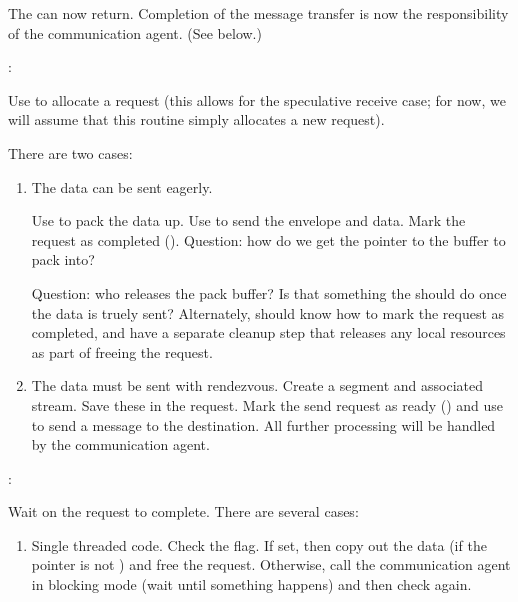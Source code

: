 \begin{mmadi}
\begin{tcp}
\begin{enumerate}
\begin{enumerate}
  The  can now return.  Completion of the message transfer
  is now the responsibility of the communication agent.  (See below.)

\end{enumerate}

\end{enumerate}
:

Use  to allocate a request (this allows for
the speculative receive case; for now, we will assume that this routine simply
allocates a new request).  

There are two cases:
\begin{enumerate}
\item The data can be sent eagerly.

Use  to pack the data up.  Use  to
send the envelope and data.  Mark the request as completed
(). 
Question: how do we get the pointer to the buffer to pack into?

Question: who releases the pack buffer?  Is that something the
 should do once the data is truely sent?  Alternately,
should  know how to mark the request as completed, and
have a separate cleanup step that releases any local resources as part of
freeing the request.

\item The data must be sent with rendezvous.
Create a segment and associated stream.  Save these in the request.
Mark the send request as ready () and use
 to send a  message to
the destination.  All further processing will be handled by the communication
agent. 
\end{enumerate}

:

Wait on the request to complete.  There are several cases:
\begin{enumerate}
\item Single threaded code.  Check the  flag.
  If set, then copy out the  data (if the 
  pointer is not ) and free the request.  Otherwise, 
  call the communication agent in blocking mode (wait until something happens)
  and then check again.


\end{enumerate}
\end{tcp}
\end{mmadi}

